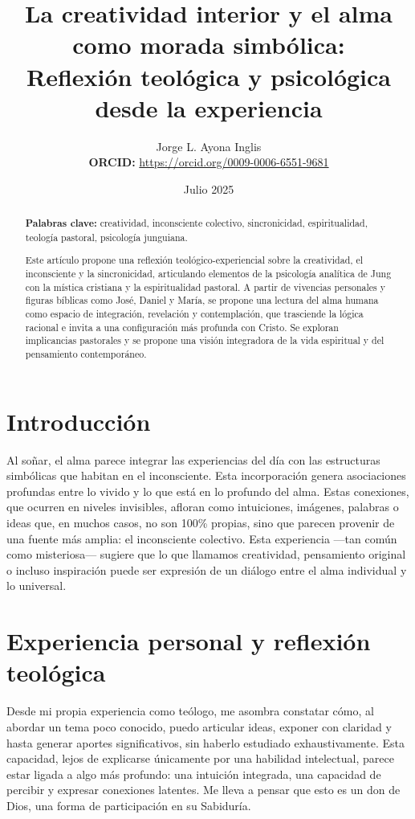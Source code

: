 \documentclass[12pt]{article}
\title{La creatividad interior y el alma como morada simbólica: \\ Reflexión teológica y psicológica desde la experiencia}
\author{Jorge L. Ayona Inglis \\
\textbf{ORCID:} \href{https://orcid.org/0009-0006-6551-9681}{https://orcid.org/0009-0006-6551-9681}}
\date{Julio 2025}
\begin{document}
\maketitle

\begin{abstract}
\textbf{Palabras clave:} creatividad, inconsciente colectivo, sincronicidad, espiritualidad, teología pastoral, psicología junguiana.

Este artículo propone una reflexión teológico-experiencial sobre la creatividad, el inconsciente y la sincronicidad, articulando elementos de la psicología analítica de Jung con la mística cristiana y la espiritualidad pastoral. A partir de vivencias personales y figuras bíblicas como José, Daniel y María, se propone una lectura del alma humana como espacio de integración, revelación y contemplación, que trasciende la lógica racional e invita a una configuración más profunda con Cristo. Se exploran implicancias pastorales y se propone una visión integradora de la vida espiritual y del pensamiento contemporáneo.
\end{abstract}

\section*{Introducción}

Al soñar, el alma parece integrar las experiencias del día con las estructuras simbólicas que habitan en el inconsciente. Esta incorporación genera asociaciones profundas entre lo vivido y lo que está en lo profundo del alma. Estas conexiones, que ocurren en niveles invisibles, afloran como intuiciones, imágenes, palabras o ideas que, en muchos casos, no son 100\% propias, sino que parecen provenir de una fuente más amplia: el inconsciente colectivo. Esta experiencia —tan común como misteriosa— sugiere que lo que llamamos creatividad, pensamiento original o incluso inspiración puede ser expresión de un diálogo entre el alma individual y lo universal.

\section*{Experiencia personal y reflexión teológica}

Desde mi propia experiencia como teólogo, me asombra constatar cómo, al abordar un tema poco conocido, puedo articular ideas, exponer con claridad y hasta generar aportes significativos, sin haberlo estudiado exhaustivamente. Esta capacidad, lejos de explicarse únicamente por una habilidad intelectual, parece estar ligada a algo más profundo: una intuición integrada, una capacidad de percibir y expresar conexiones latentes. Me lleva a pensar que esto es un don de Dios, una forma de participación en su Sabiduría.
\end{document}
